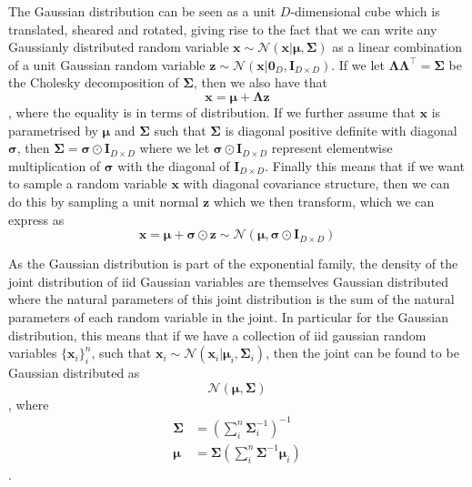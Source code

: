 The Gaussian distribution can be seen as a unit $D$-dimensional cube which is
translated, sheared and rotated, giving rise to the fact that we can write any
Gaussianly distributed random variable $\bm{x} \sim \mathcal{N}(\bm{x} |
\bm{\mu}, \bm{\Sigma})$ as a linear combination of a unit Gaussian random
variable $\bm{z} \sim \mathcal{N}(\bm{x} | \bm{0}_D, \bm{I}_{D \times D})$. If
we let $\bm{\Lambda} \bm{\Lambda}^{\top} = \bm{\Sigma}$ be the Cholesky
decomposition\cite[p.~100-102]{Press:2007:NRE:1403886} of $\bm{\Sigma}$, then we
also have that
\begin{equation}
  \label{eq:sample_x}
  \bm{x} = \bm{\mu} + \bm{\Lambda}\bm{z}
\end{equation},
where the equality is in terms of distribution. If we further assume that
$\bm{x}$ is parametrised by $\bm{\mu}$ and $\bm{\Sigma}$ such that $\bm{\Sigma}$
is diagonal positive definite with diagonal $\bm{\sigma}$, then $\bm{\Sigma} =
\bm{\sigma} \odot \bm{I}_{D \times D}$ where we let $\bm{\sigma} \odot \bm{I}_{D
\times D}$ represent
elementwise multiplication of $\bm{\sigma}$ with the diagonal of $\bm{I}_{D
  \times D}$. Finally this means that if we want to
sample a random variable $\bm{x}$ with diagonal covariance structure, then we
can do this by sampling a unit normal $\bm{z}$ which we then transform, which we can express as
\begin{equation}
  \label{eq:sample_x_diag_covariance}
  \bm{x} = \bm{\mu} + \bm{\sigma} \odot \bm{z} \sim \mathcal{N}(\bm{\mu}, \bm{\sigma} \odot \bm{I}_{D \times D})
\end{equation}

As the Gaussian distribution is part of the exponential
family\cite{Barber:2012:BRM:2207809}, the density of the joint distribution of iid
Gaussian variables are themselves Gaussian distributed where the natural
parameters of this joint distribution is the sum of the natural parameters of
each random variable in the joint. In particular for the Gaussian distribution,
this means that if we have a collection of iid gaussian random variables
$\{\bm{x}_i\}_i^n$, such that $\bm{x}_i \sim \mathcal{N}(\bm{x}_i | \bm{\mu}_i,
\bm{\Sigma}_{i})$, then the joint can be found to be Gaussian distributed as
\begin{equation*}
  \mathcal{N}(\bm{\mu}, \bm{\Sigma})
\end{equation*},
where
\begin{align}
  \bm{\Sigma} & = \left( \sum_i^n \bm{\Sigma}_i^{-1} \right)^{-1} \label{eq:joint_indep_normal_covariance}\\ 
  \bm{\mu} & = \bm{\Sigma}\left( \sum_i^n \bm{\Sigma}^{-1} \bm{\mu}_i \right) \label{eq:joint_indep_normal_mean}
\end{align}\cite[p.~78-84]{Bishop:2006}.

